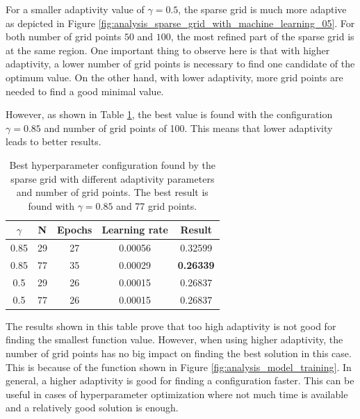 For a smaller adaptivity value of $ \gamma = 0.5 $, the sparse grid is much more adaptive as depicted in Figure \ref{fig:analysis_sparse_grid_with_machine_learning_05}. For both number of grid points $ 50 $ and $ 100 $, the most refined part of the sparse grid is at the same region. One important thing to observe here is that with higher adaptivity, a lower number of grid points is necessary to find one candidate of the optimum value. On the other hand, with lower adaptivity, more grid points are needed to find a good minimal value. 

However, as shown in Table \ref{tab:analysis_sparse_grid_with_machine_learning_results}, the best value is found with the configuration $ \gamma = 0.85 $ and number of grid points of 100. This means that lower adaptivity leads to better results.

\begin{table}[htbp!]
	\centering
	\begin{tabular}{| c c | c c | c |} 
		\hline
		$ \gamma $ & N &  Epochs & Learning rate & Result \\
		\hline
		0.85 & 29 & 27 & 0.00056 & 0.32599 \\
		0.85 & 77 & 35 & 0.00029 & \textbf{0.26339} \\
		0.5 & 29 & 26 & 0.00015 & 0.26837 \\
		0.5 & 77 & 26 & 0.00015 & 0.26837 \\
		\hline
	\end{tabular}
	\caption{ Best hyperparameter configuration found by the sparse grid with different adaptivity parameters and number of grid points. The best result is found with $ \gamma = 0.85 $ and 77 grid points. }
	\label{tab:analysis_sparse_grid_with_machine_learning_results}
\end{table}

The results shown in this table prove that too high adaptivity is not good for finding the smallest function value. However, when using higher adaptivity, the number of grid points has no big impact on finding the best solution in this case. This is because of the function shown in Figure \ref{fig:analysis_model_training}. In general, a higher adaptivity is good for finding a configuration faster. This can be useful in cases of hyperparameter optimization where not much time is available and a relatively good solution is enough. 


